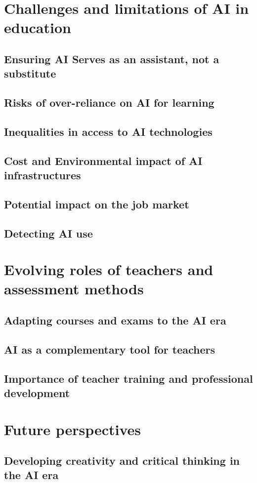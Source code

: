 \documentclass{article}
\begin{document}
\section{Challenges and limitations of AI in education}
\subsection{Ensuring AI Serves as an assistant, not a substitute}
\subsection{Risks of over-reliance on AI for learning}
\subsection{Inequalities in access to AI technologies}
\subsection{Cost and Environmental impact of AI infrastructures}
\subsection{Potential impact on the job market}
\subsection{Detecting AI use}
\section{Evolving roles of teachers and assessment methods}
\subsection{Adapting courses and exams to the AI era}
\subsection{AI as a complementary tool for teachers}
\subsection{Importance of teacher training and professional development}
\section{Future perspectives}
\subsection{Developing creativity and critical thinking in the AI era}
\end{document}
